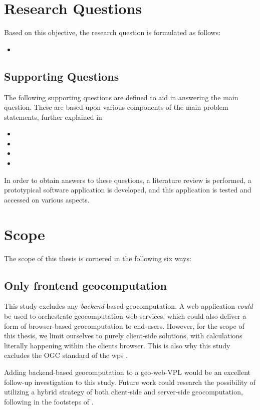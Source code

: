\section{Research Questions}
Based on this objective, the research question is formulated as follows: 
\begin{itemize}[ ]
  \item \myMainRQ
\end{itemize}

\subsection*{Supporting Questions}
The following supporting questions are defined to aid in answering the main question.
These are based upon various components of the main problem statements, further explained in 
\begin{itemize}[-]
  \item \mySubRQOne
  \item \mySubRQTwo
  \item \mySubRQThree
  \item \mySubRQFour
\end{itemize}
In order to obtain answers to these questions, a literature review is performed,
a prototypical software application is developed, 
and this application is tested and accessed on various aspects.

\newpage
\section{Scope}
The scope of this thesis is cornered in the following six ways: 

\subsection*{Only frontend geocomputation}
This study excludes any \emph {backend} based geocomputation.
A web application \textit{could} be used to orchestrate geocomputation web-services, which could also deliver a form of browser-based geocomputation to end-users. 
However, for the scope of this thesis, we limit ourselves to purely client-side solutions, with calculations literally happening within the clients browser. 
This is also why this study excludes the OGC standard of the \ac{wps} \cite{ogc_web_2015}.

Adding backend-based geocomputation to a geo-web-VPL would be an excellent follow-up investigation to this study. 
Future work could research the possibility of utilizing a hybrid strategy of both client-side and server-side geocomputation, following in the footsteps of \cite{panidi_hybrid_2015}. 

